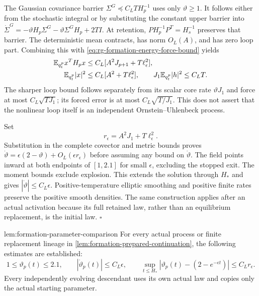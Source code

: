 The Gaussian covariance barrier
$\Sigma^G\preceq C_LT H_p^{-1}$ uses only $\vartheta\ge1$.
It follows either from the stochastic integral or by substituting the
constant upper barrier into
$\dot\Sigma^G=-\vartheta H_p\Sigma^G
-\vartheta\Sigma^GH_p+2TI$.
At retention, $P H_p^{-1}P^T=H_s^{-1}$ preserves that barrier.
The deterministic mean contracts, has norm $O_L(A)$, and has zero
loop part. Combining this with
\cref{eq:rg-formation-energy-force-bound} yields
\begin{align}
 \mathbb E_{q_t^p}x^TH_px
 &\le C_L[A^2J_{p+1}+T\ell_\epsilon^2],
 \label{eq:rg-formation-actual-energy}\\
 \mathbb E_{q_t^p}|x|^2
 &\le C_L[A^2+T\ell_\epsilon^2],
 \qquad J_1\mathbb E_{q_t^p}|h|^2\le C_LT.
 \label{eq:rg-formation-actual-moments}
\end{align}
The sharper loop bound follows separately from its scalar core rate
$\vartheta J_1$ and force at most $C_L\sqrt{TJ_1}$; its forced error
is at most $C_L\sqrt{T/J_1}$. This does not assert that the nonlinear
loop itself is an independent Ornstein--Uhlenbeck process.

Set
\begin{equation}
 r_\epsilon=A^2J_1+T\ell_\epsilon^2.
 \label{eq:rg-formation-parameter-remainder}
\end{equation}
Substitution in the complete covector and metric bounds proves
$\dot\vartheta=\epsilon(2-\vartheta)
+O_L(\epsilon r_\epsilon)$ before assuming any bound on
$\dot\vartheta$. The field points inward at both endpoints of
$[1,2.1]$ for small $\epsilon$, excluding the stopped exit.
The moment bounds exclude explosion. This extends the solution
through $H_*$ and gives $|\dot\vartheta|\le C_L\epsilon$.
Positive-temperature elliptic smoothing and positive finite rates
preserve the positive smooth densities. The same construction applies
after an actual activation because its full retained law, rather than
an equilibrium replacement, is the initial law. \hfill$\square$

{lem:formation-parameter-comparison}
For every actual process or finite replacement lineage in
\cref{lem:formation-prepared-continuation}, the following estimates
are established:
\begin{equation}
 1\le\vartheta_p(t)\le2.1,\qquad
 |\dot\vartheta_p(t)|\le C_L\epsilon,\qquad
 \sup_{t\le H_*}|\vartheta_p(t)-(2-e^{-\epsilon t})|
 \le C_Lr_\epsilon.
 \label{eq:rg-formation-parameter-comparison-proof}
\end{equation}
Every independently evolving descendant uses its own actual law and
copies only the actual starting parameter. 

